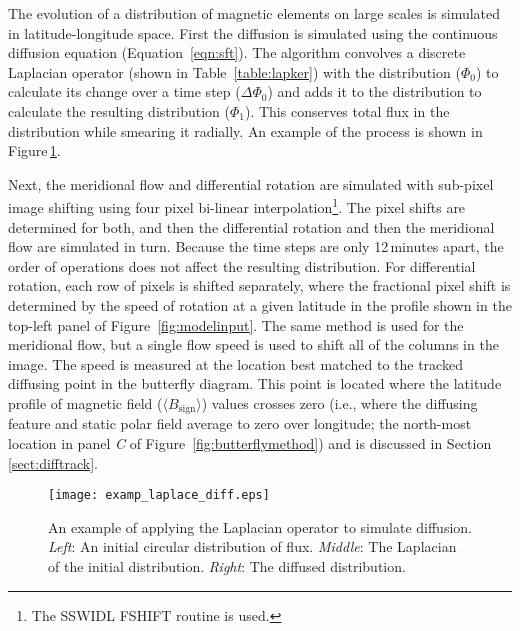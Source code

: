 The evolution of a distribution of magnetic elements on large scales is simulated in latitude-longitude space. First the diffusion is simulated using the continuous diffusion equation (Equation~\ref{eqn:sft}). The algorithm convolves a discrete Laplacian operator (shown in Table~\ref{table:lapker}) with the distribution ($\Phi_0$) to calculate its change over a time step ($\Delta \Phi_0$) and adds it to the distribution to calculate the resulting distribution ($\Phi_1$). This conserves total flux in the distribution while smearing it radially. An example of the process is shown in Figure\,\ref{fig:laplaceexamp}.

Next, the meridional flow and differential rotation are simulated with sub-pixel image shifting using four pixel bi-linear interpolation\footnote{The SSWIDL {FSHIFT} routine is used.}. The pixel shifts are determined for both, and then the differential rotation and then the meridional flow are simulated in turn. Because the time steps are only 12\,minutes apart, the order of operations does not affect the resulting distribution.
For differential rotation, each row of pixels is shifted separately, where the fractional pixel shift is determined by the speed of rotation at a given latitude in the profile shown in the top-left panel of Figure~\ref{fig:modelinput}. The same method is used for the meridional flow, but a single flow speed is used to shift all of the columns in the image. The speed is measured at the location best matched to the tracked diffusing point in the butterfly diagram. This point is located where the latitude profile of magnetic field ($\langle B_\mathrm{sign} \rangle$) values crosses zero (i.e., where the diffusing feature and static polar field average to zero over longitude; the north-most location in panel \emph{C} of Figure~\ref{fig:butterflymethod}) and is discussed in Section\,\ref{sect:difftrack}. 

 \begin{figure}[!t]    %
   \centerline{\texttt{[image: examp\_laplace\_diff.eps]}
              }
              \caption[An example of applying the Laplacian operator to simulate diffusion.]{An example of applying the Laplacian operator to simulate diffusion. \emph{Left}: An initial circular distribution of flux. \emph{Middle}: The Laplacian of the initial distribution. \emph{Right}: The diffused distribution.}
   \label{fig:laplaceexamp}
   \end{figure}

